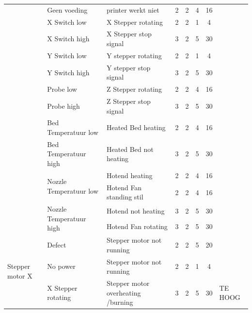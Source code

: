 \documentclass{article}
\begin{document}
\begin{landscape}
\begin{longtable}{|l|l|l|c|c|c|c|l|}
                                            & Geen voeding              & printer werkt niet        & 2 & 2 & 4 & 16 & \\
                                            & X Switch low              & X Stepper rotating        & 2 & 2 & 1 &  4 & \\
                                            & X Switch high             & X Stepper stop signal     & 3 & 2 & 5 & 30 & \\
                                            & Y Switch low              & Y stepper rotating        & 2 & 2 & 1 &  4 & \\
                                            & Y Switch high             & Y stepper stop signal     & 3 & 2 & 5 & 30 & \\
                                            & Probe low                 & Z Stepper rotating        & 2 & 2 & 4 & 16 & \\
                                            & Probe high                & Z Stepper stop signal     & 3 & 2 & 5 & 30 & \\
                                            & Bed Temperatuur low       & Heated Bed heating        & 2 & 2 & 4 & 16 & \\
                                            & Bed Temperatuur high      & Heated Bed not heating    & 3 & 2 & 5 & 30 & \\
                                            & \multirow{2}{*}{Nozzle Temperatuur low}    & Hotend heating            & 2 & 2 & 4 & 16 & \\
                                            &                                            & Hotend Fan standing stil  & 2 & 2 & 4 & 16 & \\
                                            & \multirow{2}{*}{Nozzle Temperatuur high}   & Hotend not heating        & 3 & 2 & 5 & 30 & \\
                                            &                                            & Hotend Fan rotating       & 3 & 2 & 5 & 30 & \\
                                            \hline
        \multirow{4}{*}{Stepper motor X}    & Defect                & Stepper motor not running             & 2 & 2 & 5 & 20 & \\
                                            & No power              & Stepper motor not running             & 2 & 2 & 1 &  4 & \\
                                            & X Stepper rotating    & Stepper motor overheating /burning    & 3 & 2 & 5 & 30 & TE HOOG \\

\end{longtable}
\end{landscape}
\end{document}
